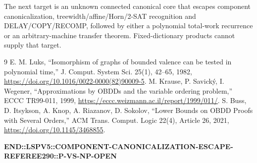 \documentclass[11pt]{article}
\begin{document}
The next target is an unknown connected canonical core that escapes component
canonicalization, treewidth/affine/Horn/2-SAT recognition and
DELAY/COPY/RECOMP, followed by either a polynomial total-work recurrence or an
arbitrary-machine transfer theorem.  Fixed-dictionary products cannot supply
that target.

\begin{thebibliography}{9}
 E. M. Luks, ``Isomorphism of graphs of bounded valence can
be tested in polynomial time,'' J. Comput. System Sci. 25(1), 42--65, 1982,
\url{https://doi.org/10.1016/0022-0000(82)90009-5}.
 M. Krause, P. Savick\'y, I. Wegener,
``Approximations by OBDDs and the variable ordering problem,'' ECCC TR99-011,
1999, \url{https://eccc.weizmann.ac.il/report/1999/011/}.
 S. Buss, D. Itsykson, A. Knop, A. Riazanov, D. Sokolov,
``Lower Bounds on OBDD Proofs with Several Orders,'' ACM Trans. Comput. Logic
22(4), Article 26, 2021, \url{https://doi.org/10.1145/3468855}.
\end{thebibliography}

\noindent\textbf{END::LSPV5::COMPONENT-CANONICALIZATION-ESCAPE-REFEREE290::P-VS-NP-OPEN}
\end{document}
